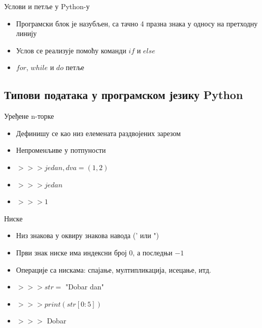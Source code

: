 \documentclass[11pt, serbianc, english]{beamer}
\begin{document}
\begin{frame}{Услови и петље у Python-у}
    \begin{itemize}
            \item
                Програмски блок је назубљен, са тачно 4 празна знака у односу на претходну линију
            \pause
            \item
                Услов се реализује помоћу команди \alert{$if$} и \alert{$else$}
            \pause
            \item
                \alert{$for$}, \alert{$while$} и \alert{$do$} петље
    \end{itemize}
\end{frame}

\subsection{Типови података у програмском језику Python}

\begin{frame}{Уређене n-торке}
    \begin{itemize}
            \item Дефинишу се као низ елемената раздвојених зарезом
            \pause
            \item Непроменљиве у потпуности
            \pause
    \end{itemize}
    \begin{Example}
        \begin{itemize}
                \item $>>> jedan, dva = (1, 2)$
                \item $>>> jedan$
                \item $>>> 1$
        \end{itemize}
    \end{Example}
\end{frame}

\begin{frame}{Ниске}
    \begin{itemize}
            \item Низ знакова у оквиру знакова навода (' или ")
            \pause
            \item Први знак ниске има индексни број $0$, а последњи $-1$
            \pause
            \item Операције са нискама: спајање, мултипликација, исецање, итд.
            \pause
    \end{itemize}
    \begin{Example}
        \begin{itemize}
        \item $>>> str =$ "Dobar dan"
        \item $>>> print(str[0:5])$
        \item $>>>$ Dobar
        \end{itemize}
    \end{Example}
\end{frame}
\end{document}
